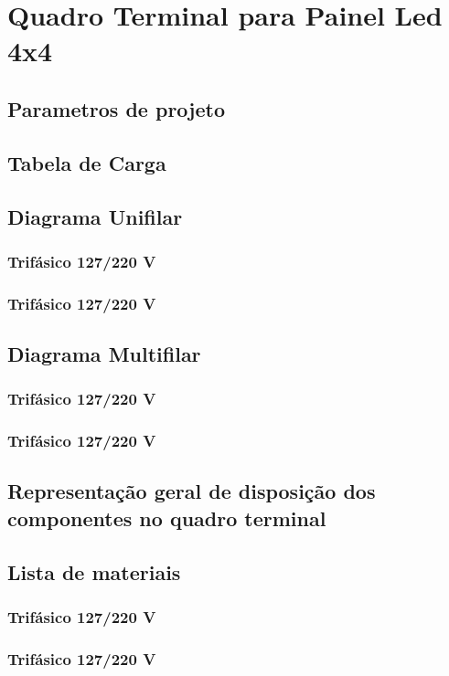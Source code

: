\section{Quadro Terminal para Painel Led 4x4}
\subsection{Parametros de projeto}
\subsection{Tabela de Carga}
\subsection{Diagrama Unifilar}

\subsubsection{Trifásico 127/220 V}

\subsubsection{Trifásico 127/220 V}

\subsection{Diagrama Multifilar}

\subsubsection{Trifásico 127/220 V}

\subsubsection{Trifásico 127/220 V}

\subsection{Representação geral de disposição dos componentes no quadro terminal}

\subsection{Lista de materiais}

\subsubsection{Trifásico 127/220 V}

\subsubsection{Trifásico 127/220 V}